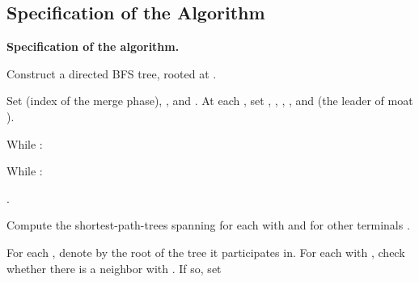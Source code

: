 \documentclass[letterpaper,11pt]{article}
\renewcommand{\paragraph}[1]{\smallskip\par\noindent\textbf{#1}}
\begin{document}
\subsection{Specification of the Algorithm}
\label{app:sublinear-code}
\paragraph{Specification of the algorithm.}
\begin{compactenum}
\item Construct a directed BFS tree, rooted at .
\item Set  (index of the merge phase), , and
. At each , set , ,
, , and  (the leader of moat ).
\item While :
\begin{compactenum}
\item While :
\begin{compactenum}
\item .
\item Compute the shortest-path-trees spanning for each 
with   and for other terminals
.
\item For each , denote by  the root of the tree  it
participates in. For each  with , check whether there
is a neighbor  with . If so, set


\end{compactenum}
\end{compactenum}
\end{compactenum}
\end{document}

